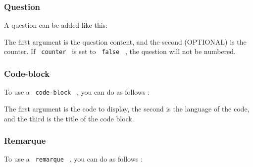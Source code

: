 \subsubsection{Question}\label{question}

A question can be added like this:

\begin{Shaded}
\begin{Highlighting}[]
\end{Highlighting}
\end{Shaded}

The first argument is the question content, and the second (OPTIONAL) is
the counter. If \texttt{\ counter\ } is set to \texttt{\ false\ } , the
question will not be numbered.

\subsubsection{Code-block}\label{code-block}

To use a \texttt{\ code-block\ } , you can do as follows :

\begin{Shaded}
\begin{Highlighting}[]
\end{Highlighting}
\end{Shaded}

The first argument is the code to display, the second is the language of
the code, and the third is the title of the code block.

\subsubsection{Remarque}\label{remarque}

To use a \texttt{\ remarque\ } , you can do as follows :

\begin{Shaded}
\begin{Highlighting}[]
\end{Highlighting}
\end{Shaded}

